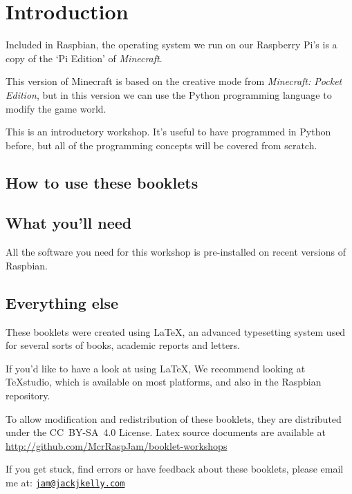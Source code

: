 \setcounter{section}{-1}
\section{Introduction}

	Included in Raspbian, the operating system we run on our Raspberry Pi's is a copy of the `Pi Edition' of \textit{Minecraft}. 
	
	This version of Minecraft is based on the creative mode from \textit{Minecraft: Pocket Edition}, but in this version we can use the Python programming language to modify the game world.
	
	This is an introductory workshop. It's useful to have programmed in Python before,  but all of the programming concepts will be covered from scratch.
		
	\subsection*{How to use these booklets}

	
	
	
	

	\subsection*{What you'll need}
		All the software you need for this workshop is pre-installed on recent versions of Raspbian.
	\subsection*{Everything else}
	
		These booklets were created using \textrm{\LaTeX}, an advanced typesetting system used for several sorts of books, academic reports and letters.
			
		If you'd like to have a look at using LaTeX, We recommend looking at \TeX studio, which is available on most platforms, and also in the 	Raspbian repository.
		
		To allow modification and redistribution of these booklets, they are distributed under the \hbox{CC BY-SA 4.0} License.
		Latex source documents are available at \url{http://github.com/McrRaspJam/booklet-workshops}
		
		If you get stuck, find errors or have feedback about these booklets, please email me at:
		\href{mailto:jam@jackjkelly.com}{\texttt{jam@jackjkelly.com}}